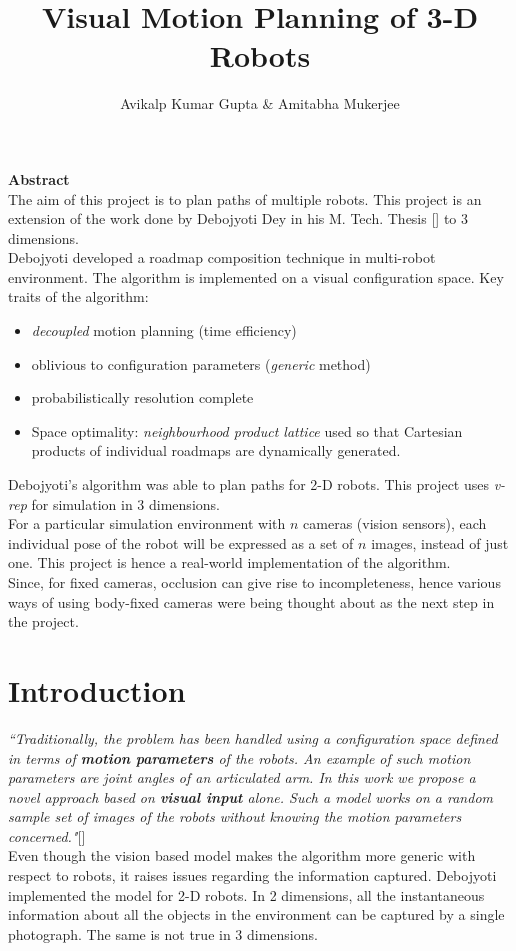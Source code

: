 \documentclass[12pt]{article}
\title{Visual Motion Planning of 3-D Robots}
\author{ Avikalp Kumar Gupta \& Amitabha Mukerjee}
\begin{document}
\maketitle
 
\textbf{\large{Abstract}}\vspace{0.4em}\\
The aim of this project is to plan paths of multiple robots. This project is an extension of the work done by Debojyoti Dey in his M. Tech. Thesis [\cite{deb}] to 3 dimensions.\\
Debojyoti developed a roadmap composition technique in multi-robot environment. The algorithm is implemented on a visual configuration space. Key traits of the algorithm:
\begin{itemize}
  \setlength\itemsep{0em}
  \item \textit{decoupled} motion planning (time efficiency)
  \item oblivious to configuration parameters (\textit{generic} method)
  \item probabilistically resolution complete
  \item Space optimality: \textit{neighbourhood product lattice} used so that Cartesian products of individual roadmaps are dynamically generated.
\end{itemize}
Debojyoti's algorithm was able to plan paths for 2-D robots. This project uses \textit{v-rep} for simulation in 3 dimensions.\\
For a particular simulation environment with $n$ cameras (vision sensors), each individual pose of the robot will be expressed as a set of $n$ images, instead of just one. This project is hence a real-world implementation of the algorithm.\\
Since, for fixed cameras, occlusion can give rise to incompleteness, hence various ways of using body-fixed cameras were being thought about as the next step in the project.

\section{Introduction}
\textit{``Traditionally, the problem has been handled using a configuration space defined in terms of \textbf{motion parameters} of the robots. An example of such motion parameters are joint angles of an articulated arm. In this work we propose a novel approach based on \textbf{visual input} alone. Such a model works on a random sample set of images of the robots without knowing the motion parameters concerned."}[\cite{deb}]\\
Even though the vision based model makes the algorithm more generic with respect to robots, it raises issues regarding the information captured. Debojyoti implemented the model for 2-D robots. In 2 dimensions, all the instantaneous information about all the objects in the environment can be captured by a single photograph. The same is not true in 3 dimensions. 
\end{document}
